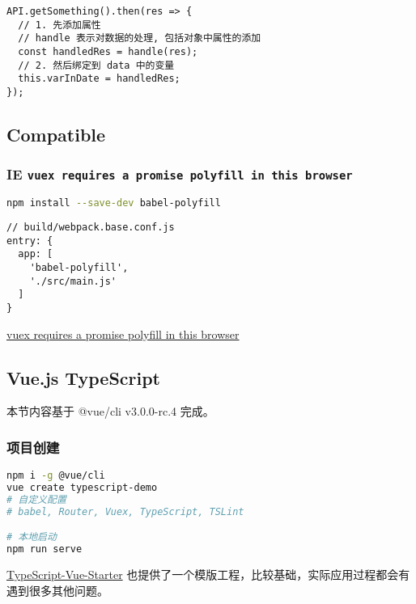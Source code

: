 \begin{lstlisting}
API.getSomething().then(res => {
  // 1. 先添加属性
  // handle 表示对数据的处理, 包括对象中属性的添加
  const handledRes = handle(res);
  // 2. 然后绑定到 data 中的变量
  this.varInDate = handledRes;
});
\end{lstlisting}

\subsection{Compatible}\label{compatible}

\subsubsection{\texorpdfstring{IE
\texttt{vuex\ requires\ a\ promise\ polyfill\ in\ this\ browser}}{IE vuex requires a promise polyfill in this browser}}\label{ie-vuex-requires-a-promise-polyfill-in-this-browser}

\begin{lstlisting}[language=bash]
npm install --save-dev babel-polyfill
\end{lstlisting}

\begin{lstlisting}
// build/webpack.base.conf.js
entry: {
  app: [
    'babel-polyfill',
    './src/main.js'
  ]
}
\end{lstlisting}

\href{https://github.com/vuejs-templates/webpack/issues/474}{vuex
requires a promise polyfill in this browser}

\subsection{Vue.js TypeScript}\label{vue.js-typescript}

本节内容基于 @vue/cli v3.0.0-rc.4 完成。

\subsubsection{项目创建}\label{ux9879ux76eeux521bux5efa}

\begin{lstlisting}[language=bash]
npm i -g @vue/cli
vue create typescript-demo
# 自定义配置
# babel, Router, Vuex, TypeScript, TSLint

# 本地启动
npm run serve
\end{lstlisting}

\href{https://github.com/Microsoft/TypeScript-Vue-Starter}{TypeScript-Vue-Starter}
也提供了一个模版工程，比较基础，实际应用过程都会有遇到很多其他问题。

